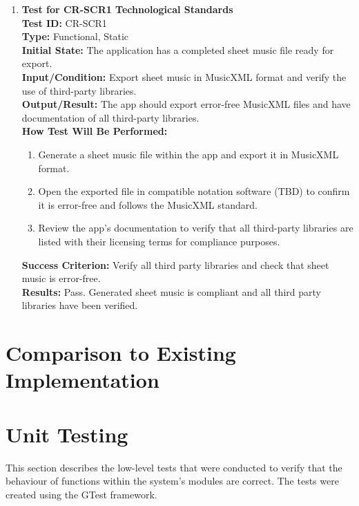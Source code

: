 \documentclass[12pt, titlepage]{article}
\begin{document}
\begin{enumerate}
    \item \textbf{Test for CR-SCR1 Technological Standards} \\
      \newline
      \textbf{Test ID:} CR-SCR1 \\
      \textbf{Type:} Functional, Static \\
      \textbf{Initial State:} The application has a completed sheet music file ready for export. \\
      \textbf{Input/Condition:} Export sheet music in MusicXML format and verify the use of third-party libraries. \\
      \textbf{Output/Result:} The app should export error-free MusicXML files and have documentation of all third-party libraries. \\
      \textbf{How Test Will Be Performed:}
      \begin{enumerate}
          \item Generate a sheet music file within the app and export it in MusicXML format.
          \item Open the exported file in compatible notation software (TBD) to confirm it is error-free and follows the 
          MusicXML standard.
          \item Review the app’s documentation to verify that all third-party libraries are listed with their licensing 
          terms for compliance purposes.
      \end{enumerate}
      \textbf{Success Criterion:} Verify all third party libraries and check that sheet music is error-free.\\
      \textbf{Results:} Pass. Generated sheet music is compliant and all third party libraries have been verified.\\
\end{enumerate}
	
\section{Comparison to Existing Implementation}	

\section{Unit Testing}

This section describes the low-level tests that were conducted to verify that the behaviour of 
functions within the system's modules are correct. The tests were created using the GTest framework.
\end{document}
